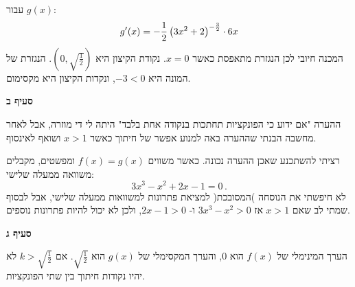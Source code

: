 \np

עבור
$g(x)$:
\[
g'(x)= -\frac{1}{2} \left(3x^2+2\right)^{-\frac{3}{2}}\cdot 6x\\
\]
המכנה חיובי לכן הנגזרת מתאפסת כאשר 
$x=0$.
נקודת הקיצון היא
$\left(0,\sqrt{\frac{1}{2}}\right)$.
הנגזרת של המונה היא
$-3<0$,
ונקדות הקיצון היא מקסימום.

\smallskip

\textbf{סעיף ב}

\vspace{-2ex}

\begin{center}
\end{center}

\vspace{-2ex}

ההערה "אם ידוע כי הפונקציות תחתכות בנקודה אחת בלבד" היתה לי די מוזרה, אבל לאחר מחשבה הבנתי שההערה באה למנוע אפשר של חיתוך כאשר
$x>1$
ושואף לאינסוף.

רציתי להשתכנע שאכן ההערה נכונה. כאשר משווים 
$f(x)=g(x)$
ומפשטים, מקבלים משוואה ממעלה שלישי:
\[
3x^3-x^2+2x-1=0\,.
\]
לא חיפשתי את הנוסחה )המסובכת( למציאת פתרונות למשוואות ממעלה שלישי, אבל לבסוף שמתי לב שאם
$x>1$
אז
$3x^3-x^2>0$
ו-%
$2x-1>0$,
ולכן לא יכול להיות פתרונות נוספים.

\textbf{סעיף ג}

הערך המינימלי של 
$f(x)$
הוא
$0$,
והערך המקסימלי של
$g(x)$
הוא
$\sqrt{\frac{1}{2}}$.
אם
$k>\sqrt{\frac{1}{2}}$
לא יהיו נקודות חיתוך בין שתי הפונקציות.

